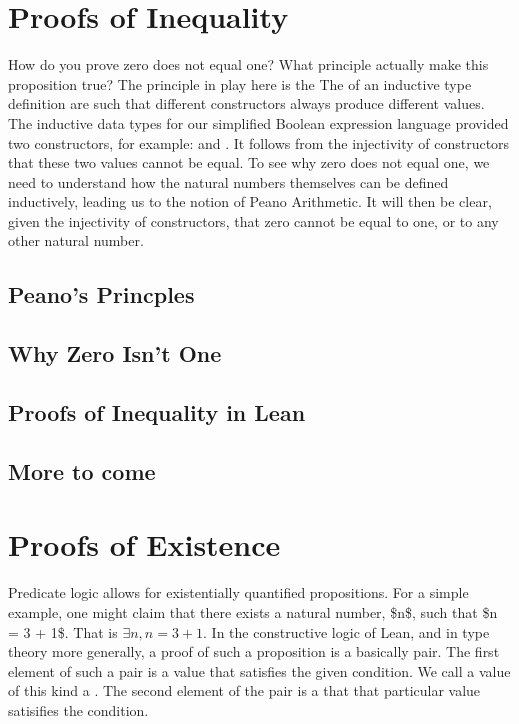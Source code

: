 \documentclass[letterpaper,10pt,english]{sphinxmanual}
\begin{document}
\chapter{Proofs of Inequality}
\label{\detokenize{17-inequality:proofs-of-inequality}}\label{\detokenize{17-inequality::doc}}
How do you prove zero does not equal one? What principle actually make
this proposition true? The principle in play here is the  The  of an
inductive type definition are such that different constructors always
produce different values. The inductive data types for our simplified
Boolean expression language provided two constructors, for example:
 and . It follows from the injectivity of constructors
that these two values cannot be equal. To see why zero does not equal
one, we need to understand how the natural numbers themselves can be
defined inductively, leading us to the notion of Peano Arithmetic. It
will then be clear, given the injectivity of constructors, that zero
cannot be equal to one, or to any other natural number.


\section{Peano’s Princples}
\label{\detokenize{17-inequality:peano-s-princples}}

\section{Why Zero Isn’t One}
\label{\detokenize{17-inequality:why-zero-isn-t-one}}

\section{Proofs of Inequality in Lean}
\label{\detokenize{17-inequality:proofs-of-inequality-in-lean}}

\section{More to come}
\label{\detokenize{17-inequality:more-to-come}}

\chapter{Proofs of Existence}
\label{\detokenize{18-existence:proofs-of-existence}}\label{\detokenize{18-existence::doc}}
Predicate logic allows for existentially quantified propositions. For
a simple example, one might claim that there exists a natural number,
\$n\$, such that \$n = 3 + 1\$. That is \(\exists n, n = 3 + 1\). In
the constructive logic of Lean, and in type theory more generally, a
proof of such a proposition is a basically pair. The first element of
such a pair is a value that satisfies the given condition. We call a
value of this kind a . The second element of the pair is a
 that that particular value satisifies the condition.
\end{document}
